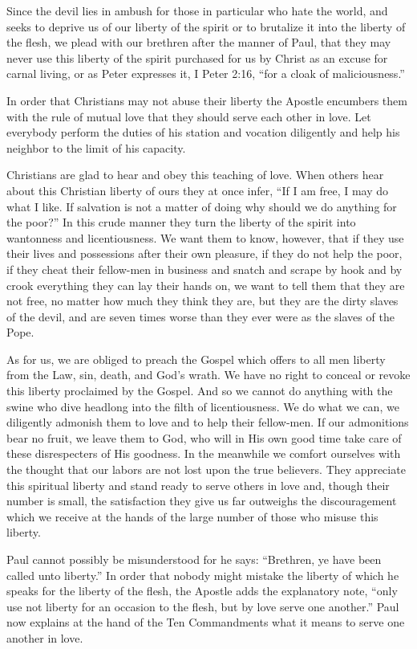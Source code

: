Since the devil lies in ambush for those in particular who hate the world, and seeks to deprive us of our liberty of the spirit or to brutalize it into the liberty of the flesh, we plead with our brethren after the manner of Paul, that they may never use this liberty of the spirit purchased for us by Christ as an excuse for carnal living, or as Peter expresses it, I Peter 2:16, “for a cloak of maliciousness.”

In order that Christians may not abuse their liberty the Apostle encumbers them with the rule of mutual love that they should serve each other in love. Let everybody perform the duties of his station and vocation diligently and help his neighbor to the limit of his capacity.

Christians are glad to hear and obey this teaching of love. When others hear about this Christian liberty of ours they at once infer, “If I am free, I may do what I like. If salvation is not a matter of doing why should we do anything for the poor?” In this crude manner they turn the liberty of the spirit into wantonness and licentiousness. We want them to know, however, that if they use their lives and possessions after their own pleasure, if they do not help the poor, if they cheat their fellow-men in business and snatch and scrape by hook and by crook everything they can lay their hands on, we want to tell them that they are not free, no matter how much they think they are, but they are the dirty slaves of the devil, and are seven times worse than they ever were as the slaves of the Pope.

As for us, we are obliged to preach the Gospel which offers to all men liberty from the Law, sin, death, and God’s wrath. We have no right to conceal or revoke this liberty proclaimed by the Gospel. And so we cannot do anything with the swine who dive headlong into the filth of licentiousness. We do what we can, we diligently admonish them to love and to help their fellow-men. If our admonitions bear no fruit, we leave them to God, who will in His own good time take care of these disrespecters of His goodness. In the meanwhile we comfort ourselves with the thought that our labors are not lost upon the true believers. They appreciate this spiritual liberty and stand ready to serve others in love and, though their number is small, the satisfaction they give us far outweighs the discouragement which we receive at the hands of the large number of those who misuse this liberty.

Paul cannot possibly be misunderstood for he says: “Brethren, ye have been called unto liberty.” In order that nobody might mistake the liberty of which he speaks for the liberty of the flesh, the Apostle adds the explanatory note, “only use not liberty for an occasion to the flesh, but by love serve one another.” Paul now explains at the hand of the Ten Commandments what it means to serve one another in love.

